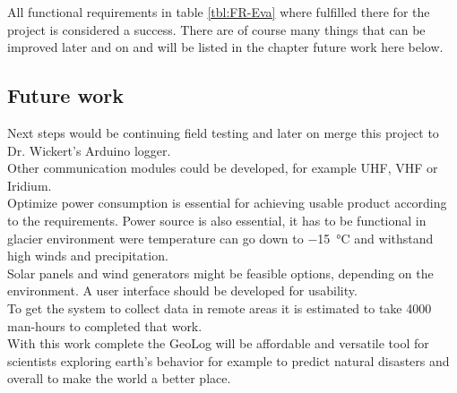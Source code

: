 All functional requirements in table \ref{tbl:FR-Eva} where fulfilled there for the project is considered a success. There are of course many things that can be improved later and on and will be listed in the chapter future work here below.

\label{sec:futureWork}
\subsection*{Future work}
Next steps would be continuing field testing and later on merge this project to Dr. Wickert's Arduino logger. \\
Other communication modules could be developed, for example UHF, VHF or Iridium.\\
Optimize power consumption is essential for achieving usable product according to the requirements. Power source is also essential, it has to be functional in glacier environment were temperature can go down to \SI{-15}{\celsius} and withstand high winds and precipitation. \\
Solar panels and wind generators might be feasible options, depending on the environment.  
A user interface should be developed for usability. \\
To get the system to collect data in remote areas it is estimated to take 4000 man-hours to completed that work.\\
With this work complete the GeoLog will be affordable and versatile tool for scientists exploring earth's behavior for example to predict natural disasters and overall to make the world a better place.